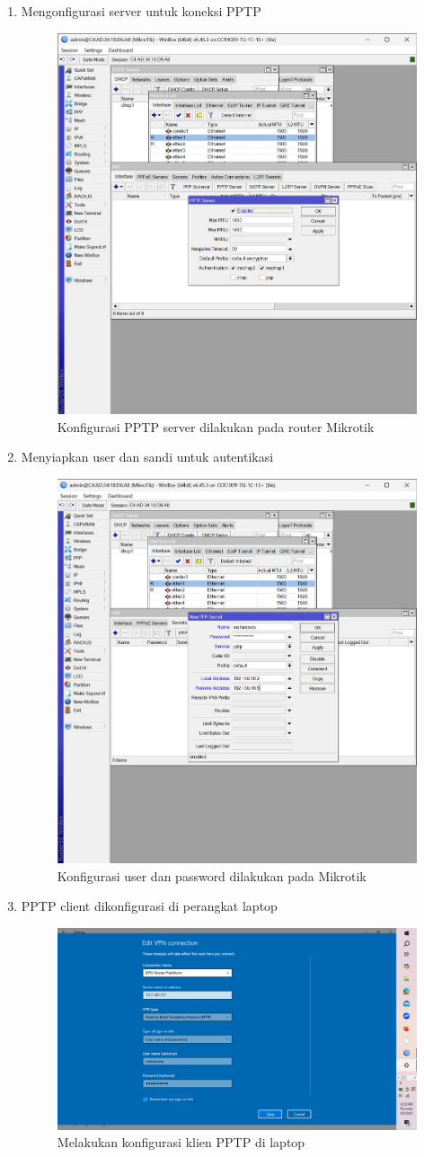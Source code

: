 \begin{enumerate}
    \item Mengonfigurasi server untuk koneksi PPTP
    \begin{figure}[H]
        \centering
        \includegraphics[width=0.5\linewidth]{P1/img/gambar7.jpeg}
        \caption{Konfigurasi PPTP server dilakukan pada router Mikrotik}
        \label{fig:PPTP-server-mikrotik}
    \end{figure}
    
    \item Menyiapkan user dan sandi untuk autentikasi
    \begin{figure}[H]
        \centering
        \includegraphics[width=0.5\linewidth]{P1/img/gambar8.jpeg}
        \caption{Konfigurasi user dan password dilakukan pada Mikrotik}
        \label{fig:User-password-mikrotik}
    \end{figure}
    
    \item PPTP client dikonfigurasi di perangkat laptop
    \begin{figure}[H]
        \centering
        \includegraphics[width=0.5\linewidth]{P1/img/gambar9.jpeg}
        \caption{Melakukan konfigurasi klien PPTP di laptop}
        \label{fig:PPTP-client-laptop}
    \end{figure}
    

\end{enumerate}
